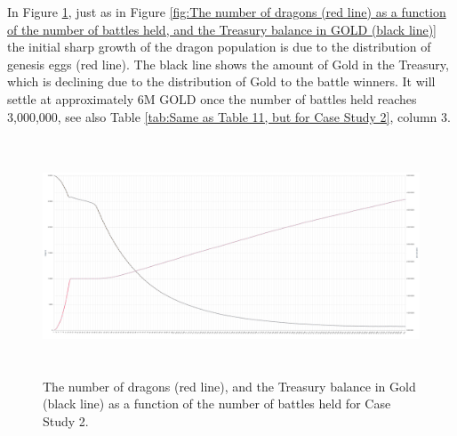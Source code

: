 \documentclass[12pt]{article}
\begin{document}
{In Figure \ref{fig:CS2The number of dragons (red line) as a function of the number of battles held, and the Treasury balance in Gold (black line).}, just as in Figure \ref{fig:The number of dragons (red line) as a function of the number of battles held, and the Treasury balance in GOLD (black line)} the initial sharp growth of the dragon population is due to the distribution of genesis eggs (red line). The black line shows the amount of Gold in the Treasury, which is declining due to the distribution of Gold to the battle winners. It will settle at approximately 6M GOLD once the number of battles held reaches 3,000,000, see also  Table \ref{tab:Same as Table 11, but for Case Study 2}, column 3.\par




\begin{figure}[H]
	\begin{Center}
		\includegraphics[width=6.27in,height=2.76in]{./media/CS2nimage30.png}
		\caption{The number of dragons (red line), and the Treasury balance in Gold (black line) as a function of the number of battles held for Case Study 2.}
		\label{fig:CS2The number of dragons (red line) as a function of the number of battles held, and the Treasury balance in Gold (black line).}
	\end{Center}
\end{figure}






}
\end{document}
